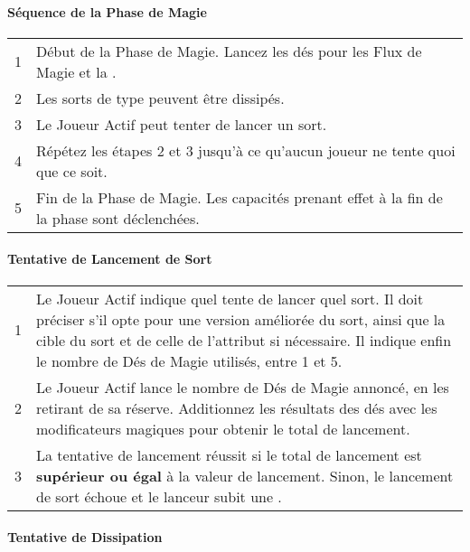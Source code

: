 {
\normalfontsize
\renewcommand{\arraystretch}{1.5}
\setlength{\tabcolsep}{6pt}
\begin{multicols}{2}\raggedcolumns

\paragraph{Séquence de la Phase de Magie}

\begin{tabular}{c|p{7.35cm}}
1 & Début de la Phase de Magie. Lancez les dés pour les Flux de Magie et la \channel{}. \tabularnewline
2 & Les sorts de type \remainsinplay{} peuvent être dissipés. \tabularnewline
3 & Le Joueur Actif peut tenter de lancer un sort. \tabularnewline
4 & Répétez les étapes 2 et 3 jusqu'à ce qu'aucun joueur ne tente quoi que ce soit. \tabularnewline
5 & Fin de la Phase de Magie. Les capacités prenant effet à la fin de la phase sont déclenchées. \tabularnewline
\end{tabular}

\vspace*{10pt}
\paragraph{Tentative de Lancement de Sort}

\begin{tabular}{c|m{7.35cm}}
1 & Le Joueur Actif indique quel \wizard{} tente de lancer quel sort. Il doit préciser s'il opte pour une version améliorée du sort, ainsi que la cible du sort et de celle de l'attribut si nécessaire. Il indique enfin le nombre de Dés de Magie utilisés, entre 1 et 5. \tabularnewline
2 & Le Joueur Actif lance le nombre de Dés de Magie annoncé, en les retirant de sa réserve. Additionnez les résultats des dés avec les modificateurs magiques pour obtenir le total de lancement. \tabularnewline
3 & La tentative de lancement réussit si le total de lancement est \textbf{supérieur ou égal} à la valeur de lancement. Sinon, le lancement de sort échoue et le lanceur subit une \lostfocus{}. \tabularnewline
\end{tabular}

\vspace*{10pt}
\paragraph{Tentative de Dissipation}


\end{multicols}}
